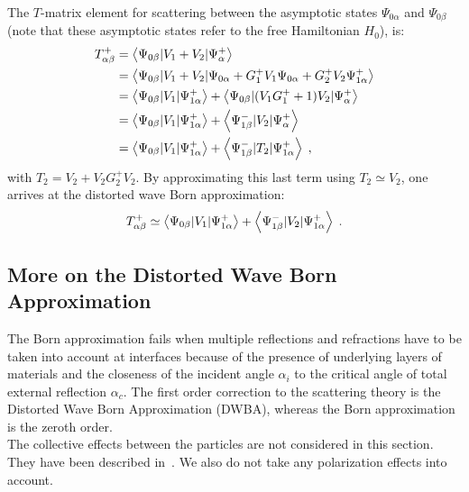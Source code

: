 The $T$-matrix element for scattering between the asymptotic states $\Psi_{0\alpha}$ and $\Psi_{0\beta}$ (note that these asymptotic states refer to the free Hamiltonian $H_0$), is:
\begin{align*}
  T^+_{\alpha\beta} &= \left\langle \Psi_{0\beta} \vert V_1+V_2 \vert \Psi^+_\alpha \right\rangle \nonumber \\
  & = \left\langle \Psi_{0\beta} \vert V_1+V_2 \vert \Psi_{0\alpha} + G^+_1V_1\Psi_{0\alpha} + G^+_2V_2\Psi^+_{1\alpha} \right\rangle \nonumber \\
  & = \left\langle \Psi_{0\beta} \vert V_1 \vert \Psi^+_{1\alpha} \right\rangle + \left\langle \Psi_{0\beta} \vert (V_1G^+_1 + 1)V_2 \vert \Psi^+_\alpha \right\rangle \\
  & = \left\langle \Psi_{0\beta} \vert V_1 \vert \Psi^+_{1\alpha} \right\rangle + \left\langle \Psi^-_{1\beta} \vert V_2 \vert \Psi^+_\alpha \right\rangle \nonumber \\
  & = \left\langle \Psi_{0\beta} \vert V_1 \vert \Psi^+_{1\alpha} \right\rangle + \left\langle \Psi^-_{1\beta} \vert T_2 \vert \Psi^+_{1\alpha} \right\rangle \; ,
\end{align*}
with $T_2 = V_2 + V_2G^+_2V_2$. By approximating this last term using $T_2 \simeq V_2$, one arrives at the distorted wave Born approximation:
\begin{equation}
  \label{eq:tdwba}
   T^+_{\alpha\beta} \simeq \left\langle \Psi_{0\beta} \vert V_1 \vert \Psi^+_{1\alpha} \right\rangle + \left\langle \Psi^-_{1\beta} \vert V_2 \vert \Psi^+_{1\alpha} \right\rangle \; .
\end{equation}


\subsection{More on the Distorted Wave Born Approximation} 

The Born approximation fails when multiple reflections and refractions have to be taken into account at interfaces because of the presence of underlying layers of materials and the closeness of  the incident angle $\alpha_i$ to the critical angle of total external reflection $\alpha_c$. The first order correction to the scattering theory is the Distorted Wave Born Approximation (DWBA), whereas the Born approximation is the zeroth order. \\
The collective effects between the particles are not considered in this section. They have been described in~.  We also do not take any polarization effects into account. \\

